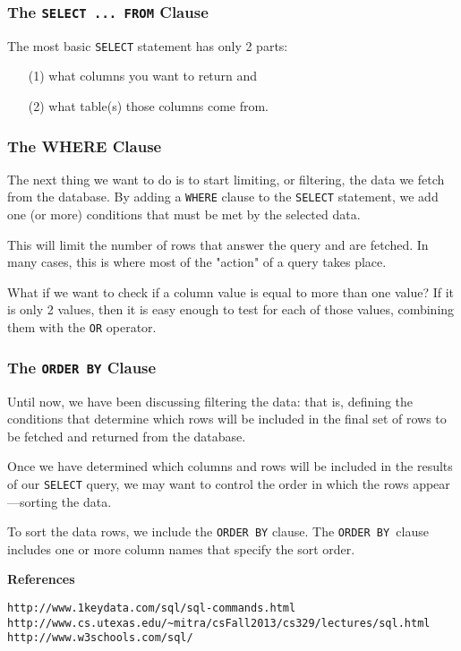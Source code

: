 \documentclass[12pt]{article}
\begin{document}
\subsubsection*{The \texttt{SELECT ... FROM} Clause}
The most basic \texttt{SELECT} statement has only 2 parts: 
\begin{itemize}
\item[(1)] what columns you want to return and 
\item[(2)] what table(s) those columns come from.
\end{itemize}

\subsubsection*{The WHERE Clause}
The next thing we want to do is to start limiting, or filtering, the data we fetch from the database. By adding a \texttt{WHERE} clause to the \texttt{SELECT} statement, we add one (or more) conditions that must be met by the selected data.

 This will limit the number of rows that answer the query and are fetched. In many cases, this is where most of the "action" of a query takes place.

What if we want to check if a column value is equal to more than one value? If it is only 2 values, then it is easy enough to test for each of those values, combining them with the \texttt{OR} operator.

\subsubsection*{The \texttt{ORDER BY} Clause}
Until now, we have been discussing filtering the data: that is, defining the conditions that determine which rows will be included in the final set of rows to be fetched and returned from the database. 

Once we have determined which columns and rows will be included in the results of our \texttt{SELECT} query, we may want to control the order in which the rows appear—sorting the data.

To sort the data rows, we include the \texttt{ORDER BY} clause. The \texttt{ORDER BY }clause includes one or more column names that specify the sort order.

\noindent \textbf{References}
\begin{verbatim}
http://www.1keydata.com/sql/sql-commands.html
http://www.cs.utexas.edu/~mitra/csFall2013/cs329/lectures/sql.html
http://www.w3schools.com/sql/
\end{verbatim}
\newpage
\end{document}
